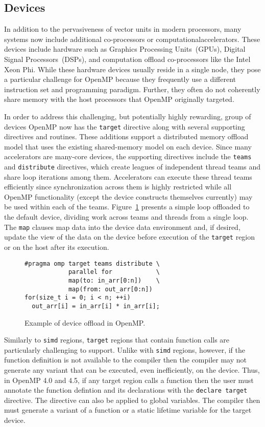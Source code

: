 \subsection{Devices}
\label{sub:devices}

In addition to the pervasiveness of vector units in modern processors, many
systems now include additional co-processors or computationalaccelerators.  
These devices include hardware such as Graphics Processing Units~(GPUs), 
Digital Signal Processors~(DSPs), and computation offload co-processors 
like the Intel Xeon Phi. While these hardware devices usually reside in 
a single node, they pose a particular challenge for OpenMP because they 
frequently use a different instruction set and programming paradigm. Further,
they often do not coherently share memory with the host processors that
OpenMP originally targeted.

In order to address this challenging, but potentially highly rewarding, 
group of devices OpenMP now has the \texttt{target} directive along with 
several supporting directives and routines. These additions support a 
distributed memory offload model that uses the existing shared-memory 
model on each device. Since many accelerators are many-core devices, the
supporting directives include the \texttt{teams} and \texttt{distribute} 
directives, which create leagues of independent thread teams and share 
loop iterations among them. Accelerators can execute these thread teams 
efficiently since synchronization across them is highly restricted while
all OpenMP functionality (except the device constructs themselves currently)
may be used within each of the teams. Figure~\ref{fig:target-loop} presents 
a simple loop offloaded to the default device, dividing work across teams 
and threads from a single loop. The \texttt{map} clauses map data into the 
device data environment and, if desired, update the view of the data on the 
device before execution of the \texttt{target} region or on the host after 
its execution.

\begin{figure}
\begin{verbatim}
#pragma omp target teams distribute \
            parallel for            \
            map(to: in_arr[0:n])    \
            map(from: out_arr[0:n])
for(size_t i = 0; i < n; ++i)
  out_arr[i] = in_arr[i] * in_arr[i];
\end{verbatim}
\caption{Example of device offload in OpenMP.\label{fig:target-loop}}
\end{figure}

Similarly to \texttt{simd} regions, \texttt{target} regions that contain 
function calls are particularly challenging to support.  Unlike with 
\texttt{simd} regions, however, if the function definition is not 
available to the compiler then the compiler may not generate any variant
that can be executed, even inefficiently, on the device. Thus, in OpenMP 4.0
and 4.5, if any target region calls a function then the user must annotate  
the function defintion and its declarations with the \texttt{declare target} 
directive. The directive can also be applied to global variables. The compiler
then must generate a variant of a function or a static lifetime variable for 
the target device. 




